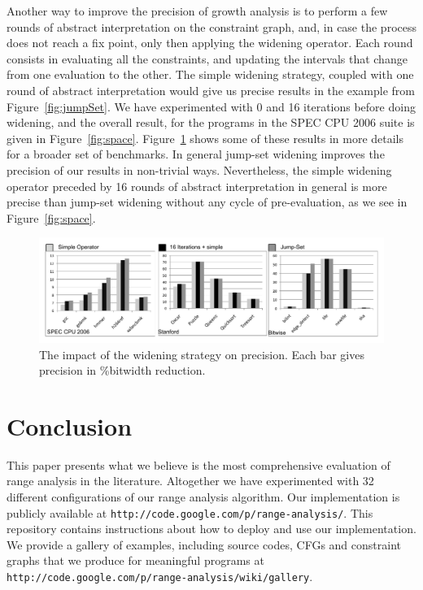 \documentclass{paper}
\begin{document}
Another way to improve the precision of growth analysis is to perform a few
rounds of abstract interpretation on the constraint graph, and, in case the
process does not reach a fix point, only then applying the widening operator.
Each round consists in evaluating all the constraints, and updating the
intervals that change from one evaluation to the other.
The simple widening strategy, coupled with one round of abstract interpretation
would give us precise results in the example from Figure~\ref{fig:jumpSet}.
We have experimented with 0 and 16 iterations before doing widening, and the
overall result, for the programs in the SPEC CPU 2006 suite is given in
Figure~\ref{fig:space}.
Figure~\ref{fig:wideningPrec} shows some of these results in more details
for a broader set of benchmarks.
In general jump-set widening improves the precision of our results in
non-trivial ways.
Nevertheless, the simple widening operator preceded by 16 rounds of
abstract interpretation in general is more precise than jump-set widening
without any cycle of pre-evaluation, as we see in Figure~\ref{fig:space}.

\begin{figure}[t!]
\begin{center}
\includegraphics[width=1\textwidth]{images/wideningPrec}
\end{center}
\caption{\label{fig:wideningPrec}
The impact of the widening strategy on precision.
Each bar gives precision in \%bitwidth reduction.}
\end{figure}


\section{Conclusion}
\label{sec:con}

This paper presents what we believe is the most comprehensive evaluation of
range analysis in the literature.
Altogether we have experimented with 32 different configurations of our
range analysis algorithm.
Our implementation is
publicly available at \texttt{http://code.google.com/p/range-analysis/}.
This repository contains instructions about how to deploy and use our
implementation.
We provide a gallery of examples, including source codes,
CFGs and constraint graphs that we produce for meaningful programs at
\texttt{http://code.google.com/p/range-analysis/wiki/gallery}.



\end{document}

